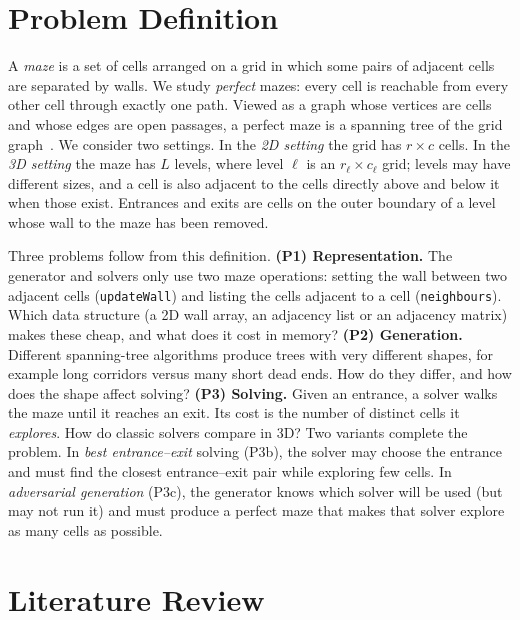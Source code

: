 
\section{Problem Definition}
\label{sec:problem}

A \emph{maze} is a set of cells arranged on a grid in which some pairs of adjacent cells are separated by walls.
We study \emph{perfect} mazes: every cell is reachable from every other cell through exactly one path.
Viewed as a graph whose vertices are cells and whose edges are open passages, a perfect maze is a spanning tree of the grid graph~\cite{buck2015mazes}.
We consider two settings.
In the \emph{2D setting} the grid has $r \times c$ cells.
In the \emph{3D setting} the maze has $L$ levels, where level $\ell$ is an $r_\ell \times c_\ell$ grid; levels may have different sizes, and a cell is also adjacent to the cells directly above and below it when those exist.
Entrances and exits are cells on the outer boundary of a level whose wall to the maze has been removed.

Three problems follow from this definition.
\textbf{(P1) Representation.} The generator and solvers only use two maze operations: setting the wall between two adjacent cells (\texttt{updateWall}) and listing the cells adjacent to a cell (\texttt{neighbours}).
Which data structure (a 2D wall array, an adjacency list or an adjacency matrix) makes these cheap, and what does it cost in memory?
\textbf{(P2) Generation.} Different spanning-tree algorithms produce trees with very different shapes, for example long corridors versus many short dead ends.
How do they differ, and how does the shape affect solving?
\textbf{(P3) Solving.} Given an entrance, a solver walks the maze until it reaches an exit.
Its cost is the number of distinct cells it \emph{explores}.
How do classic solvers compare in 3D?
Two variants complete the problem.
In \emph{best entrance--exit} solving (P3b), the solver may choose the entrance and must find the closest entrance--exit pair while exploring few cells.
In \emph{adversarial generation} (P3c), the generator knows which solver will be used (but may not run it) and must produce a perfect maze that makes that solver explore as many cells as possible.

\section{Literature Review}
\label{sec:literature}

